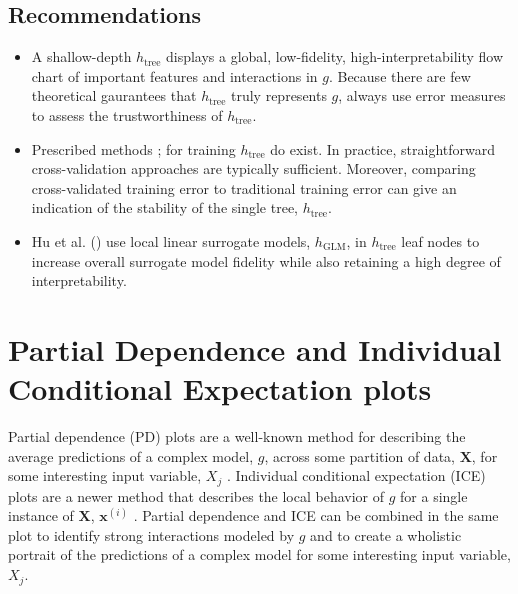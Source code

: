 \documentclass{article}
\begin{document}
\subsection{Recommendations}

\begin{itemize}
	
	\item A shallow-depth $h_{\text{tree}}$ displays a global, low-fidelity, high-interpretability flow chart of important features and interactions in $g$. Because there are few theoretical gaurantees that $h_{\text{tree}}$ truly represents $g$, always use error measures to assess the trustworthiness of $h_{\text{tree}}$.
	
	\item Prescribed methods \cite{dt_surrogate1}; \cite{dt_surrogate2} for training $h_{\text{tree}}$ do exist. In practice, straightforward cross-validation approaches are typically sufficient. Moreover, comparing cross-validated training error to traditional training error can give an indication of the stability of the single tree, $h_{\text{tree}}$.
	
	\item Hu et al. (\citeyear{lime-sup}) use local linear surrogate models, $h_{\text{GLM}}$, in $h_{\text{tree}}$ leaf nodes to increase overall surrogate model fidelity while also retaining a high degree of interpretability.
	
\end{itemize}

\section{Partial Dependence and Individual Conditional Expectation plots}
\label{sec:pd_ice}

Partial dependence (PD) plots are a well-known method for describing the average predictions of a complex model, $g$, across some partition of data, $\mathbf{X}$, for some interesting input variable, $X_j$ \cite{esl}. Individual conditional expectation (ICE) plots are a newer method that describes the local behavior of $g$ for a single instance of $\mathbf{X}$, $\mathbf{x}^{(i)}$ \cite{ice_plots}. Partial dependence and ICE can be combined in the same plot to identify strong interactions modeled by $g$ and to create a wholistic portrait of the predictions of a complex model for some interesting input variable, $X_j$.
\end{document}
